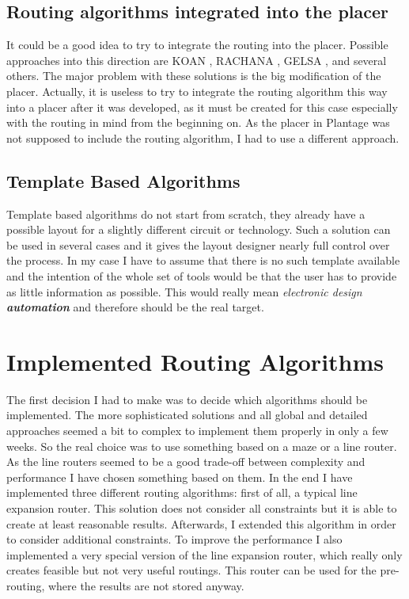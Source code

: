 \subsection{Routing algorithms integrated into the placer}
It could be a good idea to try to integrate the routing into the placer. Possible approaches into this direction are KOAN \cite[page 178]{springer:eda_analog_routing}, RACHANA \cite[page 178]{springer:eda_analog_routing}, GELSA \cite[page 179]{springer:eda_analog_routing}, and several others. The major problem with these solutions is the big modification of the placer. Actually, it is useless to try to integrate the routing algorithm this way into a placer after it was developed, as it must be created for this case especially with the routing in mind from the beginning on. As the placer in Plantage was not supposed to include the routing algorithm, I had to use a different approach.

\subsection{Template Based Algorithms}
Template based algorithms do not start from scratch, they already have a possible layout for a slightly different circuit or technology. Such a solution can be used in several cases and it gives the layout designer nearly full control over the process. In my case I have to assume that there is no such template available and the intention of the whole set of tools would be that the user has to provide as little information as possible. This would really mean \textit{electronic design \textbf{automation}} and therefore should be the real target.

\section{Implemented Routing Algorithms}
\label{sec:implemented_algorithms}
The first decision I had to make was to decide which algorithms should be implemented. The more sophisticated solutions and all global and detailed approaches seemed a bit to complex to implement them properly in only a few weeks. So the real choice was to use something based on a maze or a line router. As the line routers seemed to be a good trade-off between complexity and performance I have chosen something based on them. In the end I have implemented three different routing algorithms: first of all, a typical line expansion router. This solution does not consider all constraints but it is able to create at least reasonable results. Afterwards, I extended this algorithm in order to consider additional constraints. To improve the performance I also implemented a very special version of the line expansion router, which really only creates feasible but not very useful routings. This router can be used for the pre-routing, where the results are not stored anyway.

